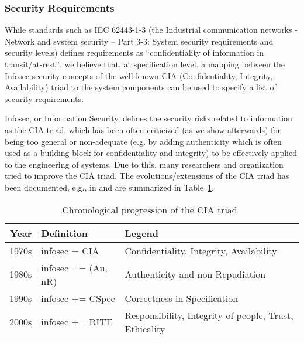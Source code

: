 \subsubsection{Security Requirements} 
While standards such as IEC 62443-1-3 (the Industrial communication networks -
Network and system security -- Part 3-3: System security requirements and
security levels) defines requirements as ``confidentiality of information in
transit/at-rest'', we believe that, at specification level, a mapping
between the Infosec security concepts of the well-known CIA (Confidentiality,
Integrity, Availability) triad to the system components can be used to specify
a list of security requirements.

Infosec, or Information Security, defines the security risks related to
information as the CIA triad, which has been often criticized
(as we show afterwards) for being too general or non-adequate (e.g. by
adding authenticity which is often used as a building block for confidentiality
and integrity) to be effectively applied to the engineering of systems. Due to
this, many researchers and organization tried to improve the CIA triad.  The
evolutions/extensions of the CIA triad has been documented, e.g., in
\autocite{Samonas2014cia} and are summarized in Table~\ref{tab:ciaevolution}.

\begin{table}[h]
\centering
\small
\begin{tabular}{rll} 
	{\bf Year} & {\bf Definition} & {\bf Legend}\\
	\hline
	1970s & infosec = CIA & Confidentiality, Integrity, Availability\\
	1980s & infosec += (Au, nR) & Authenticity and non-Repudiation\\
	1990s & infosec += CSpec & Correctness in Specification\\
	2000s & infosec += RITE & Responsibility, Integrity of people, Trust, Ethicality
\end{tabular}
\caption{Chronological progression of the CIA triad~\label{tab:ciaevolution}}
\end{table}


